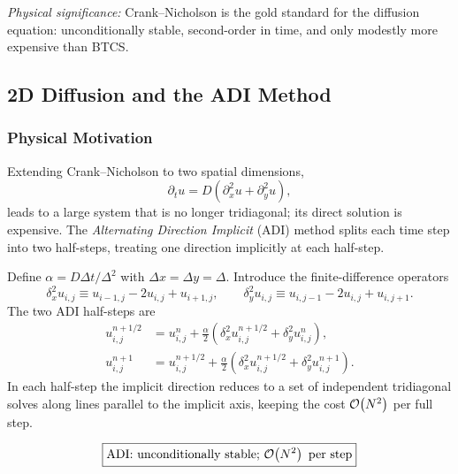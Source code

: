 \textit{Physical significance:} Crank--Nicholson is the gold standard
for the diffusion equation: unconditionally stable, second-order in
time, and only modestly more expensive than BTCS.

\subsection{2D Diffusion and the ADI Method}\label{subsec:lec09:adi}

\subsubsection*{Physical Motivation}
Extending Crank--Nicholson to two spatial dimensions,
\begin{equation}
  \partial_t u = D(\partial_x^2 u + \partial_y^2 u),
  \label{eq:lec09:2d-diffusion}
\end{equation}
leads to a large system that is no longer tridiagonal; its direct
solution is expensive.  The \emph{Alternating Direction Implicit}
(ADI) method splits each time step into two half-steps, treating
one direction implicitly at each half-step.

Define $\alpha = D\Delta t/\Delta^2$ with $\Delta x=\Delta y=\Delta$.
Introduce the finite-difference operators
\begin{equation}
  \delta_x^2 u_{i,j} \equiv u_{i-1,j}-2u_{i,j}+u_{i+1,j},
  \qquad
  \delta_y^2 u_{i,j} \equiv u_{i,j-1}-2u_{i,j}+u_{i,j+1}.
  \label{eq:lec09:finite-diff-ops}
\end{equation}
The two ADI half-steps are
\begin{align}
  u_{i,j}^{n+1/2}
  &= u_{i,j}^{n}
   + \frac{\alpha}{2}\!\left(
       \delta_x^2 u_{i,j}^{n+1/2}
       + \delta_y^2 u_{i,j}^{n}
     \right),
  \label{eq:lec09:adi-step1}\\
  u_{i,j}^{n+1}
  &= u_{i,j}^{n+1/2}
   + \frac{\alpha}{2}\!\left(
       \delta_x^2 u_{i,j}^{n+1/2}
       + \delta_y^2 u_{i,j}^{n+1}
     \right).
  \label{eq:lec09:adi-step2}
\end{align}
In each half-step the implicit direction reduces to a set of independent
tridiagonal solves along lines parallel to the implicit axis, keeping
the cost $\mathcal{O}\!\left(N^2\right)$ per full step.

\begin{equation}
  \boxed{\text{ADI: unconditionally stable; }\mathcal{O}\!\left(N^2\right)\text{ per step}}
  \label{eq:lec09:adi-cost}
\end{equation}

